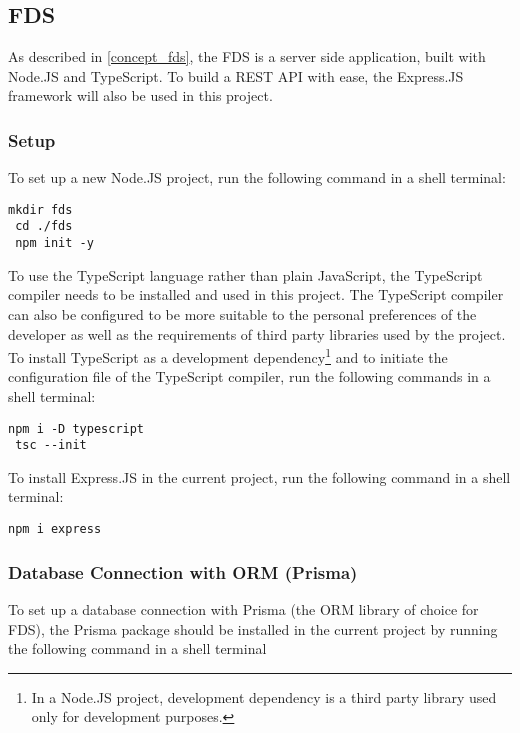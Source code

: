  \subsection{FDS}
 As described in \autoref{concept_fds}, the FDS is a server side application, built with Node.JS and TypeScript. To build a REST API with ease, the Express.JS framework will also be used in this project. 

  \subsubsection{Setup}
  To set up a new Node.JS project, run the following command in a shell terminal:

   \begin{lstlisting}[caption={Creating a new Node.JS program (Shell)}]
 mkdir fds
 cd ./fds
 npm init -y
   \end{lstlisting}
   
  To use the TypeScript language rather than plain JavaScript, the TypeScript compiler needs to be installed and used in this project. The TypeScript compiler can also be configured to be more suitable to the personal preferences of the developer as well as the requirements of third party libraries used by the project. To install TypeScript as a development dependency\footnote{In a Node.JS project, development dependency is a third party library used only for development purposes.} and to initiate the configuration file of the TypeScript compiler, run the following commands in a shell terminal:
  
   \begin{lstlisting}[caption={Installing and configuring TypeScript compiler (Shell)}]
 npm i -D typescript
 tsc --init
   \end{lstlisting}
  
  To install Express.JS in the current project, run the following command in a shell terminal:
  
   \begin{lstlisting}[caption={Installing Express.JS (Shell)}]
 npm i express
   \end{lstlisting}
  
  \subsubsection{Database Connection with ORM (Prisma)}
   To set up a database connection with Prisma (the ORM library of choice for FDS), the Prisma package should be installed in the current project by running the following command in a shell terminal

